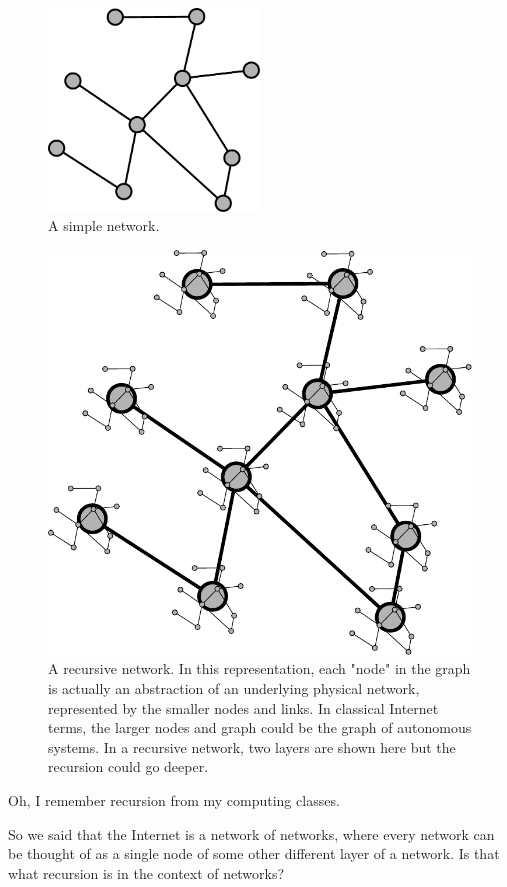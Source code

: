 \begin{figure}[t]
    \centering
    \includegraphics[width=0.5\textwidth]{lesson15/R2L15fig2.pdf}
    \caption[A simple network]{A simple network.}
    \label{fig:15-2-simple}
\end{figure}

\begin{figure}[t]
    \centering
    \includegraphics[width=.5\textwidth]{lesson15/R2L15fig3.pdf}
    \caption[A recursive network]{A recursive network. In this representation, each "node" in the graph is actually an abstraction of an underlying physical network, represented by the smaller nodes and links. In classical Internet terms, the larger nodes and graph could be the graph of autonomous systems.  In a  recursive network, two layers are shown here but the recursion could go deeper.}
    \label{fig:15-3-recursive}
\end{figure}

\mmm Oh, I remember recursion from my computing classes.

So we said that the Internet is a network of networks, where every network can be thought of as a single node of some other different layer of a network. Is that what recursion is in the context of networks?

